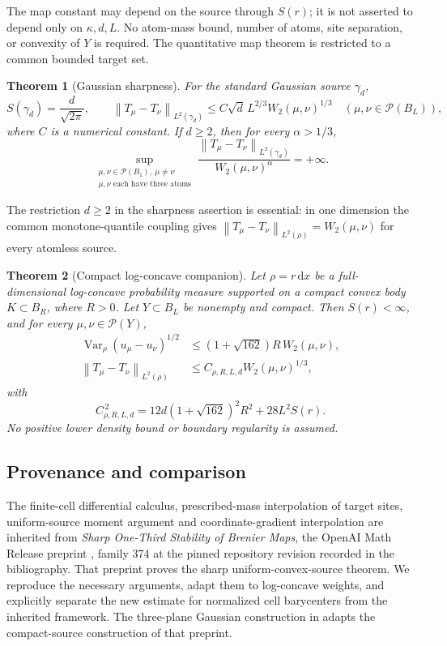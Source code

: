 \documentclass[11pt]{article}
\numberwithin{equation}{section}
\newtheorem{theorem}{Theorem}[section]
\theoremstyle{remark}
\newcommand{\Prob}{\mathcal P}
\newcommand{\Var}{\operatorname{Var}}
\newcommand{\dd}{\,\mathrm d}
\newcommand{\norm}[1]{\left\lVert #1\right\rVert}
\begin{document}
The map constant may depend on the source through $S(r)$; it is not asserted to depend only on $\kappa,d,L$. No atom-mass bound, number of atoms, site separation, or convexity of $Y$ is required. The quantitative map theorem is restricted to a common bounded target set.

\begin{theorem}[Gaussian sharpness]\label{thm:sharp}
For the standard Gaussian source $\gamma_d$,
\[
 S(\gamma_d)=\frac{d}{\sqrt{2\pi}},\qquad
 \norm{T_\mu-T_\nu}_{L^2(\gamma_d)}
 \le C\sqrt d\,L^{2/3}W_2(\mu,\nu)^{1/3}
 \quad(\mu,\nu\in\Prob(B_L)),
\]
where $C$ is a numerical constant. If $d\ge2$, then for every $\alpha>1/3$,
\begin{equation}\label{eq:sharp-claim}
 \sup_{\substack{\mu,\nu\in\Prob(B_1),\ \mu\ne\nu\\
                  \mu,\nu\text{ each have three atoms}}}
 \frac{\norm{T_\mu-T_\nu}_{L^2(\gamma_d)}}{W_2(\mu,\nu)^\alpha}
 =+\infty.
\end{equation}
\end{theorem}

The restriction $d\ge2$ in the sharpness assertion is essential: in one dimension the common monotone-quantile coupling gives $\norm{T_\mu-T_\nu}_{L^2(\rho)}=W_2(\mu,\nu)$ for every atomless source.

\begin{theorem}[Compact log-concave companion]\label{thm:compact}
Let $\rho=r\dd x$ be a full-dimensional log-concave probability measure supported on a compact convex body $K\subset B_R$, where $R>0$. Let $Y\subset B_L$ be nonempty and compact. Then $S(r)<\infty$, and for every $\mu,\nu\in\Prob(Y)$,
\begin{align}
 \Var_\rho(u_\mu-u_\nu)^{1/2}
 &\le (1+\sqrt{162})R\,W_2(\mu,\nu),\label{eq:compact-potential}\\
 \norm{T_\mu-T_\nu}_{L^2(\rho)}
 &\le C_{\rho,R,L,d}W_2(\mu,\nu)^{1/3},\label{eq:compact-map}
\end{align}
with
\[
 C_{\rho,R,L,d}^{\,2}
 =12d(1+\sqrt{162})^2R^2+28L^2S(r).
\]
No positive lower density bound or boundary regularity is assumed.
\end{theorem}

\subsection{Provenance and comparison}
The finite-cell differential calculus, prescribed-mass interpolation of target sites, uniform-source moment argument and coordinate-gradient interpolation are inherited from \emph{Sharp One-Third Stability of Brenier Maps}, the OpenAI Math Release preprint \cite{OpenAI2026}, family 374 at the pinned repository revision recorded in the bibliography. That preprint proves the sharp uniform-convex-source theorem. We reproduce the necessary arguments, adapt them to log-concave weights, and explicitly separate the new estimate for normalized cell barycenters from the inherited framework. The three-plane Gaussian construction in  adapts the compact-source construction of that preprint.
\end{document}
